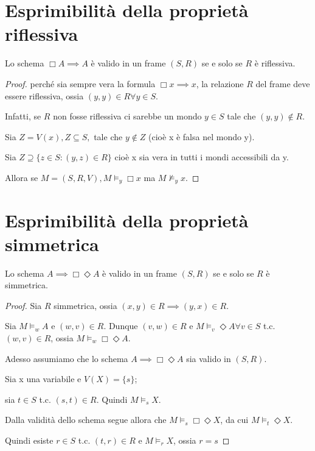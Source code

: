 \documentclass[10pt,a4paper,twoside]{book}
\begin{document}
\section{Esprimibilità della proprietà riflessiva}
\begin{theorem}
    Lo schema $\Box A \implies A$ è valido in un frame $(S,R)$ se e solo se $R$ è riflessiva.
\end{theorem}
\begin{proof}
    perché sia sempre vera la formula $\Box x \implies x$, la relazione $R$ del frame deve essere riflessiva, ossia $(y,y) \in R \forall y \in S$.

    Infatti, se $R$ non fosse riflessiva ci sarebbe un mondo $y \in S$ tale che $(y,y) \notin R$.

    Sia $Z = V(x), Z \subseteq S,$ tale che $y \notin Z$ (cioè x è falsa nel mondo y).

    Sia $Z \supseteq \{z \in S : (y,z) \in R\}$ cioè x sia vera in tutti i mondi accessibili da y.

    Allora se $M = (S, R, V), M \vDash_y \Box x$ ma $M \nvDash_y x$.
\end{proof}
\newpage

\section{Esprimibilità della proprietà simmetrica}
\begin{theorem}
    Lo schema $ A \implies \Box \Diamond A$ è valido in un frame $(S,R)$ se e solo se $R$ è simmetrica.
\end{theorem}
\begin{proof}
    Sia $R$ simmetrica, ossia $(x,y) \in R \implies (y,x) \in R$.

    Sia $M \vDash_w A$ e $(w,v) \in R$. Dunque $(v,w) \in R$ e $M \vDash_v \Diamond A \forall v \in S$ t.c. $(w,v) \in R$, ossia $M \vDash_w \Box \Diamond A$.

    Adesso assumiamo che lo schema $A \implies \Box \Diamond A $ sia valido in $(S,R)$.

    Sia x una variabile e $V(X) = \{s\}$;

    sia $t \in S$ t.c. $(s,t) \in R$. Quindi $M \vDash_s X$.

    Dalla validità dello schema segue allora che $M \vDash_s \Box \Diamond X$, da cui $M \vDash_t \Diamond X$.

    Quindi esiste $r \in S$ t.c. $(t,r) \in R$ e $M \vDash_r X$, ossia $r = s$
\end{proof}
\newpage
\end{document}
